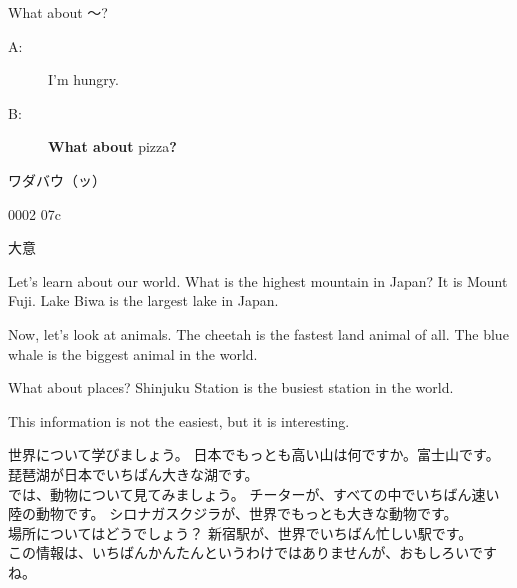 \documentclass[aspectratio=169,xcolor={dvipsnames,table}]{beamer}
\begin{document}
\begin{frame}[plain,t]

\end{frame}
\begin{frame}[plain]{What about ～?}
\Large
\begin{description}
 \item[A:] I'm hungry. 
 \item[B:] \textbf{What about} pizza\textbf{?} 
\end{description}

\vspace{20pt}

\normalsize
\hfill{} ワダバウ（ッ）

\hfill{\tiny 0002}\,{\scriptsize {}\,07c}

\end{frame}
\begin{frame}[plain]{大意}
 
\begin{tcolorbox}
\parindent=15pt

\noindent{}
Let's learn about our world.
What is the highest mountain in Japan?
It is Mount Fuji.
Lake Biwa is the largest lake in Japan.

Now, let's look at animals.
The cheetah is the fastest land animal of all.
The blue whale is the biggest animal in the world.

What about places?
Shinjuku Station is the busiest station in the world.

This information is not the easiest, but it is interesting.
\end{tcolorbox}

\vspace{5pt}
\small

\zw
世界について学びましょう。
日本でもっとも高い山は何ですか。富士山です。 琵琶湖が日本でいちばん大きな湖です。\\
では、動物について見てみましょう。 チーターが、すべての中でいちばん速い陸の動物です。 シロナガスクジラが、世界でもっとも大きな動物です。\\
場所についてはどうでしょう？ 新宿駅が、世界でいちばん忙しい駅です。\\
この情報は、いちばんかんたんというわけではありませんが、おもしろいですね。
\end{frame}
\end{document}
